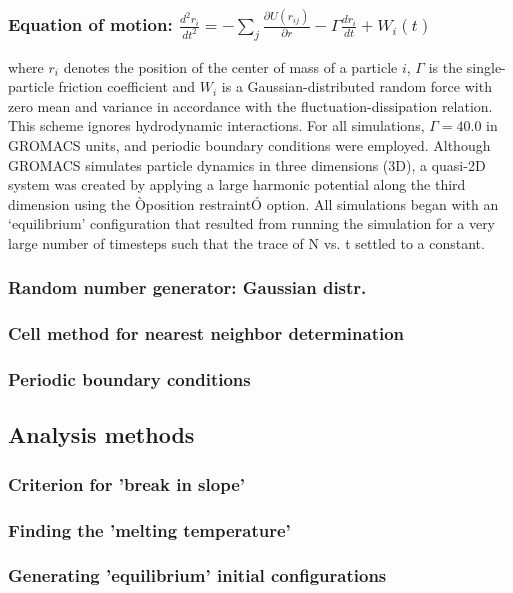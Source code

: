\documentclass{umthesis}
\begin{document}
\subsubsection{Equation of motion: $\frac{d^2 r_i}{dt^2}  = - \sum_j \frac{\partial{U(r_{ij})}}{{\partial r}}  - \Gamma  \frac{d r_i}{dt} + W_i (t)$}
\label{sec-2.2.2.2}

where $r_i$ denotes the position of the center of mass of a particle $i$, $\Gamma$ is the single-particle friction coefficient and $W_i$ is a Gaussian-distributed random force with zero mean and variance in accordance with the fluctuation-dissipation relation.  This scheme ignores hydrodynamic interactions. For all simulations, $\Gamma=40.0$ in GROMACS units, and periodic boundary conditions were employed. Although GROMACS simulates particle dynamics in three dimensions (3D), a quasi-2D system was created by applying a large harmonic potential along the third dimension using the Òposition restraintÓ option. All simulations began with an `equilibrium' configuration that resulted from running the simulation for a very large number of timesteps such that the trace of N vs. t settled to a constant.
\subsubsection{Random number generator: Gaussian distr.}
\label{sec-2.2.2.3}
\subsubsection{Cell method for nearest neighbor determination}
\label{sec-2.2.2.4}
\subsubsection{Periodic boundary conditions}
\label{sec-2.2.2.5}
\subsection{Analysis methods}
\label{sec-2.2.3}
\subsubsection{Criterion for 'break in slope'}
\label{sec-2.2.3.1}
\subsubsection{Finding the 'melting temperature'}
\label{sec-2.2.3.2}
\subsubsection{Generating 'equilibrium' initial configurations}
\label{sec-2.2.3.3}
\end{document}
